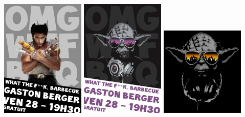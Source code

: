         \includegraphics[width=0.3\textwidth]{img/WTFBBQwolv.jpg}
        \includegraphics[width=0.3\textwidth]{img/WTFBBQyoda.jpg}
        \includegraphics[width=0.3\textwidth]{img/yoda-or.jpg}
    





